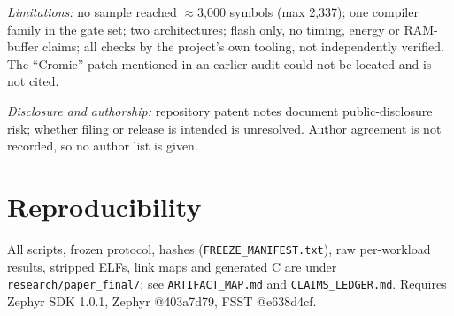 \documentclass[10pt,twocolumn]{article}
\begin{document}
\emph{Limitations:} no sample reached $\approx$3{,}000 symbols (max 2{,}337); one compiler family in the gate set; two architectures; flash only, no timing, energy or RAM-buffer claims; all checks by the project's own tooling, not independently verified. The ``Cromie'' patch mentioned in an earlier audit could not be located and is not cited.

\emph{Disclosure and authorship:} repository patent notes document public-disclosure risk; whether filing or release is intended is unresolved. Author agreement is not recorded, so no author list is given.

\section{Reproducibility}
All scripts, frozen protocol, hashes (\texttt{FREEZE\_MANIFEST.txt}), raw per-workload results, stripped ELFs, link maps and generated C are under \texttt{research/paper\_final/}; see \texttt{ARTIFACT\_MAP.md} and \texttt{CLAIMS\_LEDGER.md}. Requires Zephyr SDK 1.0.1, Zephyr @403a7d79, FSST @e638d4cf.



\end{document}
